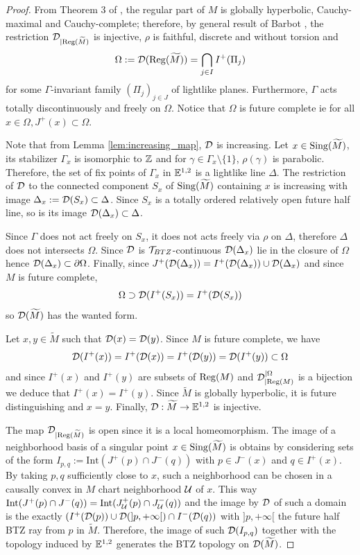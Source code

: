\begin{proof}
 From Theorem 3 of \cite{brunswic2021cauchy}, the regular part of $M$ is globally hyperbolic, Cauchy-maximal and Cauchy-complete; therefore, by general result of Barbot \cite{barbot_globally_2004}, the restriction $\mathcal{D}_{|\mathrm{Reg}(\widetilde M)}$ is injective, $\rho$ is faithful, discrete and without torsion and $$ \Omega:=\mathcal{D}(\mathrm{Reg}(\widetilde M)) =\bigcap_{j\in I} I^+(\Pi_j)$$ for some $\Gamma$-invariant family $(\Pi_j)_{j\in J}$ of lightlike planes. Furthermore, $\Gamma$ acts totally discontinuously and freely on $\Omega$. Notice that $\Omega$ is future complete ie for all $x\in \Omega, J^+(x)\subset \Omega$.
 
 Note that from Lemma \ref{lem:increasing_map}, $\mathcal{D}$ is increasing.  
 Let $x\in \mathrm{Sing}(\widetilde M)$, its stabilizer $\Gamma_x$ is isomorphic to $\mathbb{Z}$ and for $\gamma\in \Gamma_x\setminus\{1\}$, $\rho(\gamma)$ is parabolic. Therefore, the set of fix points of $\Gamma_x$ in ${\mathbb E}^{1,2}_{}$ is a lightlike line $\Delta$. The restriction of $\mathcal{D}$ to the connected component  $S_x$ of $\mathrm{Sing}(\widetilde M)$ containing $x$ is increasing with image $\Delta_x:=\mathcal{D}(S_x)\subset \Delta$. 
 Since $S_x$  is a totally ordered relatively open future half line, so is its image $\mathcal{D}(\Delta_x)\subset\Delta$.
 
 Since $\Gamma$ does not act freely on $S_x$, it does not acts freely  via $\rho$ on $\Delta$, therefore $\Delta$ does not intersects $\Omega$. Since $\mathcal{D}$ is $\mathcal{T}_{BTZ}$-continuous
 $\mathcal{D}(\Delta_x)$ lie in the closure of $\Omega$ hence $\mathcal{D}(\Delta_x)\subset \partial \Omega$. 
 Finally, since $J^+(\mathcal{D}(\Delta_x)) = I^+(\mathcal{D}(\Delta_x))\cup \mathcal{D}(\Delta_x) $ and since $M$ is future complete,
 $$\Omega\supset \mathcal{D}(I^+(S_x)) =I^+(\mathcal{D}(S_x))$$ so $\mathcal{D}(\widetilde M)$ has the wanted form. 
 
 Let $x,y\in \widetilde M$ such that $\mathcal{D}(x)=\mathcal{D}(y)$. Since $M$ is future complete, we have $$\mathcal{D}(I^+(x))=I^+(\mathcal{D}(x))=I^+(\mathcal{D}(y))=\mathcal{D}(I^+(y))\subset \Omega$$
 and since $I^+(x)$ and $I^+(y)$ are subsets of $\mathrm{Reg}(M)$ and $\mathcal{D}_{|\mathrm{Reg}(M)}^{|\Omega}$ is a bijection we deduce that $I^+(x)=I^+(y)$. Since $\widetilde M$ is globally hyperbolic, it is future distinguishing and $x=y$. Finally, $\mathcal{D}:\widetilde M \rightarrow {\mathbb E}^{1,2}_{}$ is injective.
 
 The map $\mathcal{D}_{|\mathrm{Reg}(\widetilde M)}$ is open since it is a local homeomorphism. The image of a neighborhood basis of a singular point $x\in \mathrm{Sing}(\widetilde M)$ is obtains by considering sets of the form $I_{p,q}:=\mathrm{Int}(J^+(p)\cap J^-(q))$ with $p\in J^-(x)$ and $q\in I^+(x)$. By taking $p,q$ sufficiently close to $x$, such a neighborhood can be chosen in a causally convex in $M$ chart neighborhood $\mathcal{U}$ of $x$.  This way $\mathrm{Int}(J^+(p)\cap J^-(q)) = \mathrm{Int}(J_{\mathcal{U}}^+(p)\cap J_{\mathcal{U}}^-(q))$ and the image by $\mathcal{D}$ of such a domain is the exactly $(I^+(\mathcal{D}(p))\cup \mathcal{D}(]p,+\infty[)\cap I^-(\mathcal{D}(q))$ with $]p,+\infty[$ the future half BTZ ray from $p$ in $\widetilde M$. Therefore, the image of such $\mathcal{D}(I_{p,q})$ together with the topology induced by ${\mathbb E}^{1,2}_{}$ generates the BTZ topology on $\mathcal{D}(\widetilde M)$.
 

\end{proof}
